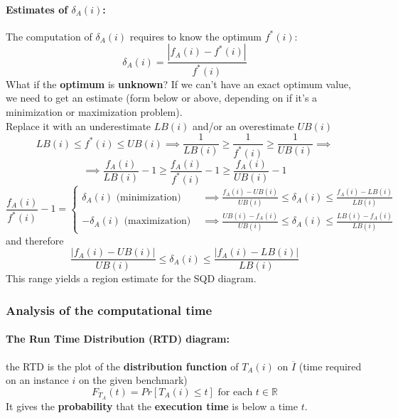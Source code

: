 \paragraph{Estimates of $\delta_A (i)$:} The computation of $\delta_A (i)$ requires to know the optimum $f^\ast (i)$:
$$ \delta_A (i) = \frac{|f_A (i) - f^\ast (i)|}{f^\ast (i)}$$
What if the \textbf{optimum} is \textbf{unknown}? If we can't have an exact optimum value, we need to get an estimate (form below or above, depending on if it's a minimization or maximization problem).\\
Replace it with an underestimate $LB (i )$ and/or an overestimate $UB (i )$
$$ LB (i ) \leq f^\ast (i) \leq UB (i ) \implies \frac{1}{LB(i)} \geq \frac{1}{f^\ast (i)} \geq \frac{1}{UB(i)} \implies $$
$$ \implies \frac{f_A(i)}{LB(i)} - 1 \geq \frac{f_A(i)}{f^\ast (i)} - 1 \geq \frac{f_A(i)}{UB(i)} - 1 $$
$$ \frac{f_A(i)}{f^\ast (i)} - 1 = \begin{cases}
	\delta_A (i) \text{ (minimization) } & \implies \frac{f_A(i) - UB(i)}{UB(i)} \leq \delta_A (i) \leq \frac{f_A(i) - LB(i)}{LB(i)} \\
	- \delta_A (i) \text{ (maximization) } & \implies \frac{UB(i) - f_A(i)}{UB(i)} \leq \delta_A (i) \leq \frac{LB(i) - f_A(i)}{LB(i)}
\end{cases}$$
and therefore
$$ \frac{|f_A(i) - UB(i)|}{UB(i)} \leq \delta_A (i) \leq \frac{|f_A(i) - LB(i)|}{LB(i)} $$
This range yields a region estimate for the SQD diagram.\\

\newpage 

\subsubsection{Analysis of the computational time}
\paragraph{The Run Time Distribution (RTD) diagram:} the RTD is the plot of the \textbf{distribution function} of $T_A (i )$ on $\overline{I}$ (time required on an instance $i$ on the given benchmark)
$$ F_{T_A} (t) = Pr \left[T_A (i) \leq t \right] \text{ for each } t \in \mathbb{R} $$
It gives the \textbf{probability} that the \textbf{execution time} is below a time $t$. \\

